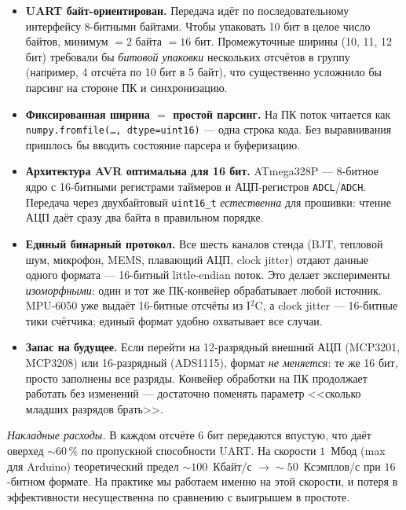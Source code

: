 \documentclass[12pt,a4paper]{extarticle}
\begin{document}
\begin{itemize}\setlength{\itemsep}{0.2em}
  \item \textbf{UART байт-ориентирован.} Передача идёт по последовательному
        интерфейсу 8-битными байтами. Чтобы упаковать 10 бит в целое число
        байтов, минимум $=\!2$ байта $=\!16$ бит. Промежуточные ширины
        (10, 11, 12 бит) требовали бы \emph{битовой упаковки} нескольких
        отсчётов в группу (например, 4 отсчёта по 10 бит в 5 байт), что
        существенно усложнило бы парсинг на стороне ПК и синхронизацию.
  \item \textbf{Фиксированная ширина $=$ простой парсинг.} На ПК поток
        читается как \texttt{numpy.fromfile(\ldots,\,dtype=uint16)} ---
        одна строка кода. Без выравнивания пришлось бы вводить состояние
        парсера и буферизацию.
  \item \textbf{Архитектура AVR оптимальна для 16 бит.} ATmega328P ---
        8-битное ядро с 16-битными регистрами таймеров и АЦП-регистров
        \texttt{ADCL}/\texttt{ADCH}. Передача через двухбайтовый
        \texttt{uint16\_t} \emph{естественна} для прошивки: чтение АЦП
        даёт сразу два байта в правильном порядке.
  \item \textbf{Единый бинарный протокол.} Все шесть каналов стенда
        (BJT, тепловой шум, микрофон, MEMS, плавающий АЦП, clock jitter)
        отдают данные одного формата --- 16-битный little-endian поток.
        Это делает эксперименты \emph{изоморфными}: один и тот же
        ПК-конвейер обрабатывает любой источник. MPU-6050 уже выдаёт
        16-битные отсчёты из I${}^2$C, а clock jitter --- 16-битные
        тики счётчика; единый формат удобно охватывает все случаи.
  \item \textbf{Запас на будущее.} Если перейти на 12-разрядный внешний
        АЦП (MCP3201, MCP3208) или 16-разрядный (ADS1115), формат
        \emph{не меняется}: те же 16 бит, просто заполнены все разряды.
        Конвейер обработки на ПК продолжает работать без изменений ---
        достаточно поменять параметр <<сколько младших разрядов брать>>.
\end{itemize}

\emph{Накладные расходы.} В каждом отсчёте 6 бит передаются впустую, что
даёт оверхед $\sim\!60\,\%$ по пропускной способности UART. На скорости
$1$~Мбод (max для Arduino) теоретический предел $\sim 100$~Кбайт/с
$\to\!\sim\!50$~Ксэмплов/с при $16$-битном формате. На практике мы
работаем именно на этой скорости, и потеря в эффективности
несущественна по сравнению с выигрышем в простоте.
\end{document}

